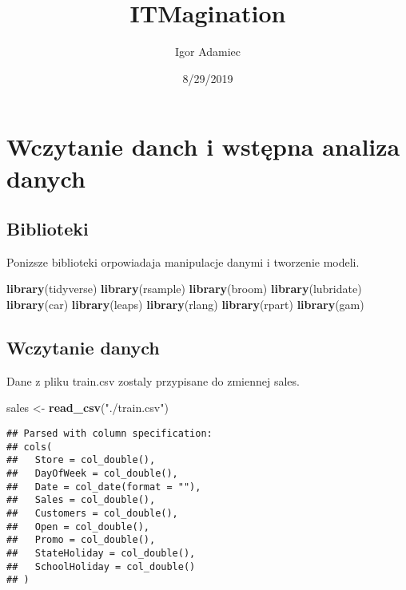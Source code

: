 \documentclass[]{article}
\title{ITMagination}
\author{Igor Adamiec}
\date{8/29/2019}
\newenvironment{Shaded}{\begin{snugshade}}{\end{snugshade}}
\newcommand{\KeywordTok}[1]{\textcolor[rgb]{0.13,0.29,0.53}{\textbf{#1}}}
\newcommand{\NormalTok}[1]{#1}
\newcommand{\StringTok}[1]{\textcolor[rgb]{0.31,0.60,0.02}{#1}}
\begin{document}
\maketitle

\hypertarget{wczytanie-danch-i-wstepna-analiza-danych}{%
\section{Wczytanie danch i wstępna analiza
danych}\label{wczytanie-danch-i-wstepna-analiza-danych}}

\hypertarget{biblioteki}{%
\subsection{Biblioteki}\label{biblioteki}}

Ponizsze biblioteki orpowiadaja manipulacje danymi i tworzenie modeli.

\begin{Shaded}
\begin{Highlighting}[]
\KeywordTok{library}\NormalTok{(tidyverse)}
\KeywordTok{library}\NormalTok{(rsample)}
\KeywordTok{library}\NormalTok{(broom)}
\KeywordTok{library}\NormalTok{(lubridate)}
\KeywordTok{library}\NormalTok{(car)}
\KeywordTok{library}\NormalTok{(leaps)}
\KeywordTok{library}\NormalTok{(rlang)}
\KeywordTok{library}\NormalTok{(rpart)}
\KeywordTok{library}\NormalTok{(gam)}
\end{Highlighting}
\end{Shaded}

\hypertarget{wczytanie-danych}{%
\subsection{Wczytanie danych}\label{wczytanie-danych}}

Dane z pliku train.csv zostaly przypisane do zmiennej sales.

\begin{Shaded}
\begin{Highlighting}[]
\NormalTok{sales <-}\StringTok{ }\KeywordTok{read_csv}\NormalTok{(}\StringTok{"./train.csv"}\NormalTok{)}
\end{Highlighting}
\end{Shaded}

\begin{verbatim}
## Parsed with column specification:
## cols(
##   Store = col_double(),
##   DayOfWeek = col_double(),
##   Date = col_date(format = ""),
##   Sales = col_double(),
##   Customers = col_double(),
##   Open = col_double(),
##   Promo = col_double(),
##   StateHoliday = col_double(),
##   SchoolHoliday = col_double()
## )
\end{verbatim}
\end{document}
